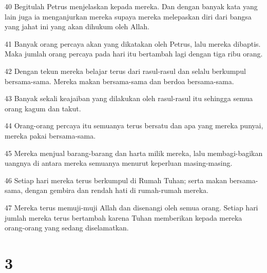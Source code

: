 \par 40 Begitulah Petrus menjelaskan kepada mereka. Dan dengan banyak kata yang lain juga ia menganjurkan mereka supaya mereka melepaskan diri dari bangsa yang jahat ini yang akan dihukum oleh Allah.
\par 41 Banyak orang percaya akan yang dikatakan oleh Petrus, lalu mereka dibaptis. Maka jumlah orang percaya pada hari itu bertambah lagi dengan tiga ribu orang.
\par 42 Dengan tekun mereka belajar terus dari rasul-rasul dan selalu berkumpul bersama-sama. Mereka makan bersama-sama dan berdoa bersama-sama.
\par 43 Banyak sekali keajaiban yang dilakukan oleh rasul-rasul itu sehingga semua orang kagum dan takut.
\par 44 Orang-orang percaya itu semuanya terus bersatu dan apa yang mereka punyai, mereka pakai bersama-sama.
\par 45 Mereka menjual barang-barang dan harta milik mereka, lalu membagi-bagikan uangnya di antara mereka semuanya menurut keperluan masing-masing.
\par 46 Setiap hari mereka terus berkumpul di Rumah Tuhan; serta makan bersama-sama, dengan gembira dan rendah hati di rumah-rumah mereka.
\par 47 Mereka terus memuji-muji Allah dan disenangi oleh semua orang. Setiap hari jumlah mereka terus bertambah karena Tuhan memberikan kepada mereka orang-orang yang sedang diselamatkan.

\chapter{3}


